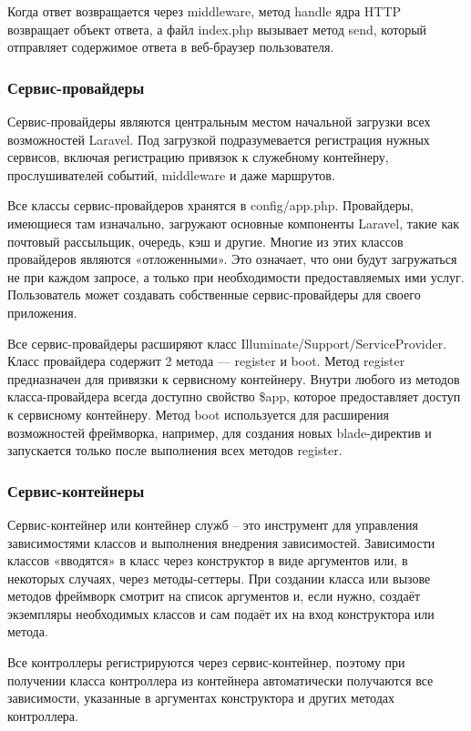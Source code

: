 Когда ответ возвращается через middleware, метод handle ядра HTTP возвращает объект ответа, а файл index.php вызывает метод send, который отправляет содержимое ответа в веб-браузер пользователя.


\subsubsection{Сервис-провайдеры}

Сервис-провайдеры являются центральным местом начальной загрузки всех возможностей Laravel. Под загрузкой подразумевается регистрация нужных сервисов, включая регистрацию привязок к служебному контейнеру, прослушивателей событий, middleware и даже маршрутов.

Все классы сервис-провайдеров хранятся в config/app.php. Провайдеры, имеющиеся там изначально, загружают основные компоненты Laravel, такие как почтовый рассыльщик, очередь, кэш и другие. Многие из этих классов провайдеров являются «отложенными». Это означает, что они будут загружаться не при каждом запросе, а только при необходимости предоставляемых ими услуг. Пользователь может создавать собственные сервис-провайдеры для своего приложения.

Все сервис-провайдеры расширяют класс Illuminate/Support/ServiceProvider. Класс провайдера содержит 2 метода — register и boot. Метод register предназначен для привязки к сервисному контейнеру. Внутри любого из методов класса-провайдера всегда доступно свойство \$app, которое предоставляет доступ к сервисному контейнеру. Метод boot используется для расширения возможностей фреймворка, например, для создания новых blade-директив и запускается только после выполнения всех методов register.

\subsubsection{Сервис-контейнеры}

Сервис-контейнер или контейнер служб – это инструмент для управления зависимостями классов и выполнения внедрения зависимостей. Зависимости классов «вводятся» в класс через конструктор в виде аргументов или, в некоторых случаях, через методы-сеттеры. При создании класса или вызове методов фреймворк смотрит на список аргументов и, если нужно, создаёт экземпляры необходимых классов и сам подаёт их на вход конструктора или метода. 

Все контроллеры регистрируются через сервис-контейнер, поэтому при получении класса контроллера из контейнера автоматически получаются все зависимости, указанные в аргументах конструктора и других методах контроллера.


